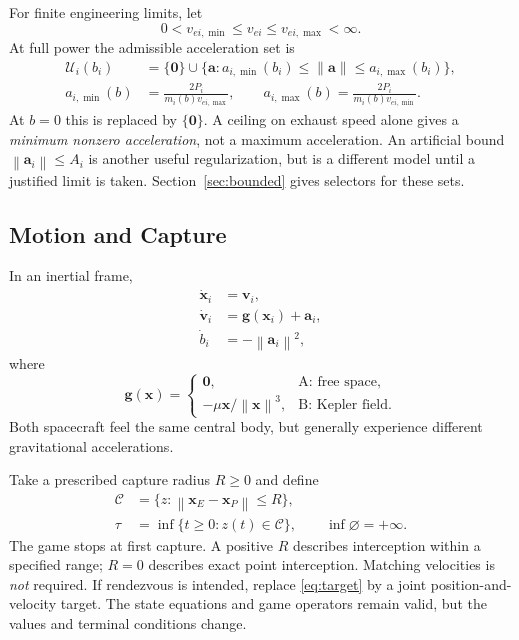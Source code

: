 \documentclass[journal,a4paper]{IEEEtran}
\newcommand{\C}{\mathcal C}
\newcommand{\U}{\mathcal U}
\newcommand{\norm}[1]{\left\|#1\right\|}
\begin{document}
For finite engineering limits, let
\begin{equation}
 0<v_{ei,\min}\le v_{ei}\le v_{ei,\max}<\infty.
\end{equation}
At full power the admissible acceleration set is
\begin{align}
 \U_i(b_i)&=\{\mathbf0\}\cup
 \{\mathbf a:a_{i,\min}(b_i)\le\norm{\mathbf a}
                         \le a_{i,\max}(b_i)\},\label{eq:annulus}\\
 a_{i,\min}(b)&=\frac{2P_i}{m_i(b)v_{ei,\max}},\qquad
 a_{i,\max}(b)=\frac{2P_i}{m_i(b)v_{ei,\min}}.\nonumber
\end{align}
At $b=0$ this is replaced by $\{\mathbf0\}$. A ceiling on exhaust speed alone gives a \emph{minimum nonzero acceleration}, not a maximum acceleration. An artificial bound $\norm{\mathbf a_i}\le A_i$ is another useful regularization, but is a different model until a justified limit is taken. Section~\ref{sec:bounded} gives selectors for these sets.

\subsection{Motion and Capture}
In an inertial frame,
\begin{subequations}\label{eq:fullstate}
\begin{align}
 \dot{\mathbf x}_i&=\mathbf v_i,\\
 \dot{\mathbf v}_i&=\mathbf g(\mathbf x_i)+\mathbf a_i,\\
 \dot b_i&=-\norm{\mathbf a_i}^2,
\end{align}
\end{subequations}
where
\begin{equation}
 \mathbf g(\mathbf x)=
 \begin{cases}
 \mathbf0,&\text{A: free space},\\
 -\mu\mathbf x/\norm{\mathbf x}^3,&\text{B: Kepler field}.
 \end{cases}
 \label{eq:gravity}
\end{equation}
Both spacecraft feel the same central body, but generally experience different gravitational accelerations.

Take a prescribed capture radius $R\ge0$ and define
\begin{align}
 \C&=\{z:\norm{\mathbf x_E-\mathbf x_P}\le R\},\label{eq:target}\\
 \tau&=\inf\{t\ge0:z(t)\in\C\},\qquad \inf\varnothing=+\infty.
 \label{eq:tau}
\end{align}
The game stops at first capture. A positive $R$ describes interception within a specified range; $R=0$ describes exact point interception. Matching velocities is \emph{not} required. If rendezvous is intended, replace \eqref{eq:target} by a joint position-and-velocity target. The state equations and game operators remain valid, but the values and terminal conditions change.
\end{document}
